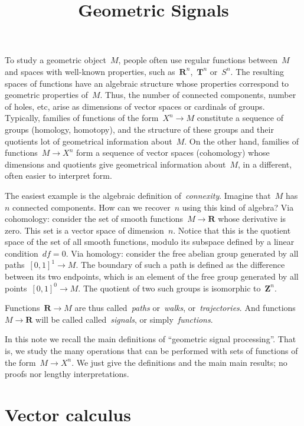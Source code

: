 \title{Geometric Signals}



\newcommand{\1}{\mathbf{1}}
\newcommand{\R}{\mathbf{R}}
\newcommand{\T}{\mathbf{T}}
\newcommand{\Z}{\mathbf{Z}}

To study a geometric object~$M$, people often use regular functions
between~$M$ and spaces with well-known properties, such as~$\R^n$,~$\T^n$
or~$S^n$.  The resulting spaces of functions have an algebraic structure
whose properties correspond to geometric properties of~$M$.
Thus, the number of connected components, number of holes, etc, arise as
dimensions of vector spaces or cardinals of groups.
Typically,
families of functions of the form~$X^n\to M$ constitute a sequence of groups
(homology, homotopy), and the structure of these groups and their quotients
 lot of geometrical information about~$M$.  On the other hand,
families of functions~$M\to X^n$ form a sequence of vector spaces
(cohomology) whose dimensions and quotients give geometrical information
about~$M$, in a different, often easier to interpret form.

The easiest example is the algebraic definition of~\emph{connexity}.  Imagine
that~$M$ has~$n$ connected components.  How can we recover~$n$ using this kind
of algebra?
%
Via cohomology: consider the set of smooth functions~$M\to\R$ whose
derivative is zero.  This set is a vector space of dimension~$n$.
Notice that this is the quotient space of the set of all smooth functions,
modulo its subspace defined by a linear condition~$df=0$.
%
Via homology: consider the free abelian group generated by all
paths~$[0,1]^1\to M$.  The boundary of such a path is defined as the difference
between its two endpoints, which is an element of the free group generated by
all points~$[0,1]^0\to M$.  The quotient of two such groups is isomorphic
to~$\Z^n$.

Functions~$\R\to M$ are thus called~\emph{paths} or~\emph{walks},
or~\emph{trajectories}.  And functions~$M\to\R$ will be called
called~\emph{signals}, or simply~\emph{functions}.

In this note we recall the main definitions of ``geometric signal
processing''. That is, we study the many operations that can be performed with
sets of functions of the form~$M\to X^n$.  We just give the definitions and
the main main results; no proofs nor lengthy interpretations.


\clearpage
\section{Vector calculus}


